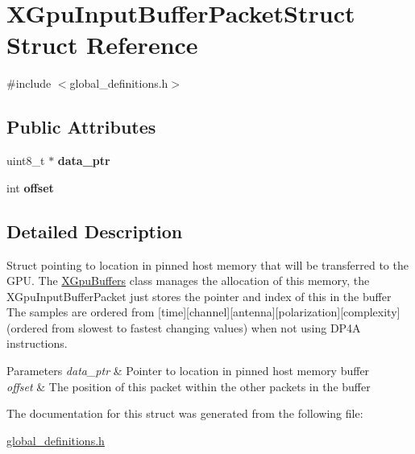 \hypertarget{struct_x_gpu_input_buffer_packet_struct}{}\section{X\+Gpu\+Input\+Buffer\+Packet\+Struct Struct Reference}
\label{struct_x_gpu_input_buffer_packet_struct}


{\ttfamily \#include $<$global\+\_\+definitions.\+h$>$}

\subsection*{Public Attributes}
\begin{DoxyCompactItemize}
\item 
uint8\+\_\+t $\ast$ {\bfseries data\+\_\+ptr}\hypertarget{struct_x_gpu_input_buffer_packet_struct_acc88fc5021f4189b34a1802cfc22b534}{}\label{struct_x_gpu_input_buffer_packet_struct_acc88fc5021f4189b34a1802cfc22b534}

\item 
int {\bfseries offset}\hypertarget{struct_x_gpu_input_buffer_packet_struct_adf391b99ec6c244f93ec3e273e26b284}{}\label{struct_x_gpu_input_buffer_packet_struct_adf391b99ec6c244f93ec3e273e26b284}

\end{DoxyCompactItemize}


\subsection{Detailed Description}
Struct pointing to location in pinned host memory that will be transferred to the G\+PU. The \hyperlink{class_x_gpu_buffers}{X\+Gpu\+Buffers} class manages the allocation of this memory, the X\+Gpu\+Input\+Buffer\+Packet just stores the pointer and index of this in the buffer The samples are ordered from \mbox{[}time\mbox{]}\mbox{[}channel\mbox{]}\mbox{[}antenna\mbox{]}\mbox{[}polarization\mbox{]}\mbox{[}complexity\mbox{]}(ordered from slowest to fastest changing values) when not using D\+P4A instructions. 
\begin{DoxyParams}{Parameters}
{\em data\+\_\+ptr} & Pointer to location in pinned host memory buffer \\
\hline
{\em offset} & The position of this packet within the other packets in the buffer \\
\hline
\end{DoxyParams}


The documentation for this struct was generated from the following file\+:\begin{DoxyCompactItemize}
\item 
\hyperlink{global__definitions_8h}{global\+\_\+definitions.\+h}\end{DoxyCompactItemize}
